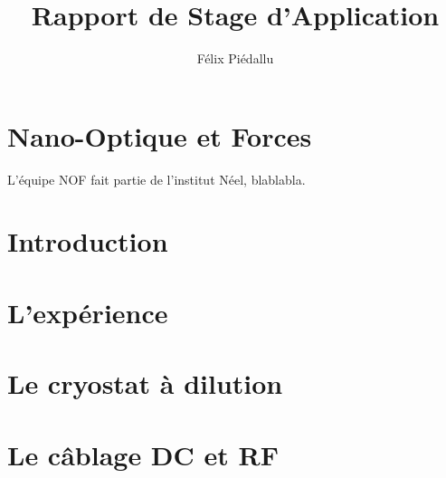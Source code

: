 \documentclass[a4paper,12pt]{report}
\date{}
\title{Rapport de Stage d'Application}
\author{Félix Piédallu}
\begin{document}
\nocite{*}


%

\chapter*{Nano-Optique et Forces}
L'équipe NOF fait partie de l'institut Néel, blablabla.

%
%
%
%





\chapter*{Introduction} %
%

\chapter{L'expérience}
%

\chapter{Le cryostat à dilution}
%

\chapter{Le câblage DC et RF}
%
\end{document}
